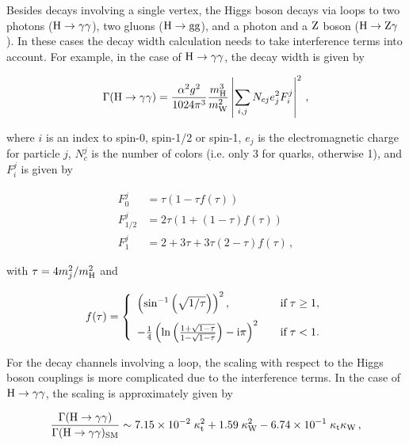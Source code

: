 Besides decays involving a single vertex, the Higgs boson decays via loops to two photons ($\mathrm{H}\to\mathrm{\gamma}\mathrm{\gamma}$), two gluons ($\mathrm{H}\to\mathrm{g}\mathrm{g}$), and a photon and a $\mathrm{Z}$ boson ($\mathrm{H}\to\mathrm{Z}\mathrm{\gamma}$).
% 
In these cases the decay width calculation needs to take interference terms into account.
% 
For example, in the case of $\mathrm{H}\to\mathrm{\gamma}\mathrm{\gamma}$, the decay width is given by~\cite{higgshunter}
% 
\begin{linenomath*}
\begin{equation}
\Gamma(\mathrm{H}\to\mathrm{\gamma}\mathrm{\gamma}) =
\frac{\alpha^2g^2}{1024\pi^3} \frac{m_{\mathrm{H}}^3}{m_\mathrm{W}^2}
\left|
\sum_{i,j} N_{cj} e_j^2 F_i^j
\right|^2
\,,
\end{equation}
\end{linenomath*}
% 
where $i$ is an index to spin-0, spin-1/2 or spin-1, $e_j$ is the electromagnetic charge  for particle $j$, $N_c^j$ is the number of colors (i.e. only 3 for quarks, otherwise 1), and $F_i^j$ is given by
% 
\begin{linenomath*}
\begin{equation}
\begin{split}
F_0^j     &= \tau (1- \tau f(\tau)) \\
F_{1/2}^j &= 2\tau ( 1 + (1-\tau) f(\tau) ) \\
F_1^j     &= 2 + 3\tau + 3\tau( 2-\tau ) f(\tau)
\,,
\end{split}
\end{equation}
\end{linenomath*}
% 
with $\tau = 4m_j^2/m_{\mathrm{H}}^2$ and
% 
\begin{linenomath*}
\begin{equation}
\label{eq:ffunction}
f(\tau) = \left\{%
\begin{array}{ll}
\left( \text{sin}^{-1}\left(\sqrt{1/\tau}\right) \right)^2 ,
    & \quad \text{if} \; \tau \ge 1, \\[9pt]
-\frac{1}{4} \left(
        \ln \left(\frac{1+\sqrt{1-\tau}}{1-\sqrt{1-\tau}} \right)
        -\imag \pi 
        \right)^2
    & \quad \text{if} \; \tau < 1.
\end{array}%
\right. 
\end{equation}
\end{linenomath*}
% 
For the decay channels involving a loop, the scaling with respect to the Higgs boson couplings is more complicated due to the interference terms.
% 
In the case of $\mathrm{H}\to\mathrm{\gamma}\mathrm{\gamma}$, the scaling is approximately given by~\cite{higgshunter}
% 
\begin{linenomath*}
\begin{equation}
\frac{\Gamma(\mathrm{H}\to\mathrm{\gamma}\mathrm{\gamma})}{\Gamma(\mathrm{H}\to\mathrm{\gamma}\mathrm{\gamma})_\text{SM}} \sim
        7.15 \times 10^{-2}    \;   \kappa_{\mathrm{t}}^2
        + 1.59                \;  \kappa_{\mathrm{W}}^2
        - 6.74 \times 10^{-1} \;  \kappa_{\mathrm{t}}\kappa_{\mathrm{W}}
\,,
\end{equation}
\end{linenomath*}
